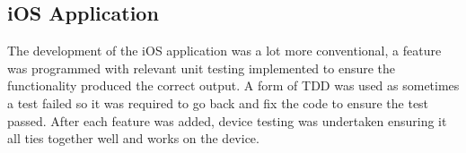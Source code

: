 	\subsection{iOS Application}
		The development of the iOS application was a lot more conventional, a feature was programmed with relevant unit testing implemented to ensure the functionality produced the correct output. A form of TDD was used as sometimes a test failed so it was required to go back and fix the code to ensure the test passed. After each feature was added, device testing was undertaken ensuring it all ties together well and works on the device.  
	